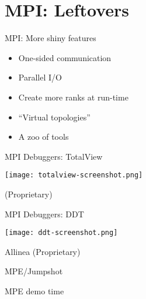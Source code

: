\documentclass[english,compress]{beamer}
\begin{document}
\section{MPI: Leftovers}
\begin{frame}{MPI: More shiny features}
  \begin{itemize}
    \item One-sided communication
    \item Parallel I/O
    \item Create more ranks at run-time
    \item ``Virtual topologies''
    \item A zoo of tools
  \end{itemize}
\end{frame}
\begin{frame}{MPI Debuggers: TotalView}
  \begin{center}
  \texttt{[image: totalview-screenshot.png]}

  (Proprietary)
  \end{center}
\end{frame}
\begin{frame}{MPI Debuggers: DDT}
  \begin{center}
  \texttt{[image: ddt-screenshot.png]}

  Allinea 
  (Proprietary)
  \end{center}
\end{frame}
\begin{frame}{MPE/Jumpshot}
  \begin{center}
  \Huge MPE demo time
  \end{center}
\end{frame}




\questionframe{}
\end{document}
